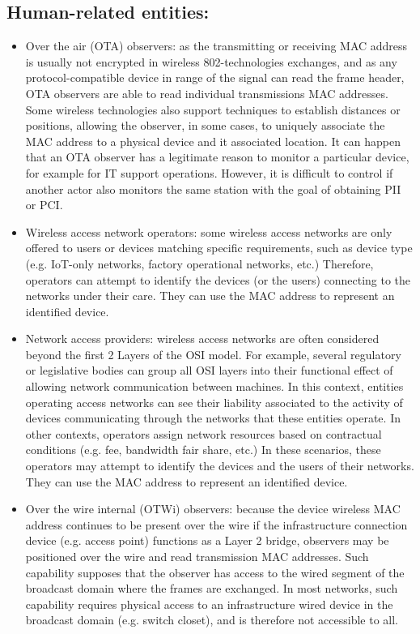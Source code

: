 \documentclass[10pt]{article}
\begin{document}
{\subsection{Human-related entities:}{
\begin{itemize}
    \item Over the air (OTA) observers: as the transmitting or receiving MAC address is usually not encrypted in wireless 802-technologies exchanges, and as any protocol-compatible device in range of the signal can read the frame header, OTA observers are able to read individual transmissions MAC addresses. Some wireless technologies also support techniques to establish distances or positions, allowing the observer, in some cases, to uniquely associate the MAC address to a physical device and it associated location. It can happen that an OTA observer has a legitimate reason to monitor a particular device, for example for IT support operations. However, it is difficult to control if another actor also monitors the same station with the goal of obtaining PII or PCI.
    \item Wireless access network operators: some wireless access networks are only offered to users or devices matching specific requirements, such as device type (e.g. IoT-only networks, factory operational networks, etc.) Therefore, operators can attempt to identify the devices (or the users) connecting to the networks under their care. They can use the MAC address to represent an identified device.
    \item Network access providers: wireless access networks are often considered beyond the first 2 Layers of the OSI model. For example, several regulatory or legislative bodies can group all OSI layers into their functional effect of allowing network communication between machines. In this context, entities operating access networks can see their liability associated to the activity of devices communicating through the networks that these entities operate. In other contexts, operators assign network resources based on contractual conditions (e.g. fee, bandwidth fair share, etc.) In these scenarios, these operators may attempt to identify the devices and the users of their networks. They can use the MAC address to represent an identified device.
    \item Over the wire internal (OTWi) observers: because the device wireless MAC address continues to be present over the wire if the infrastructure connection device (e.g. access point) functions as a Layer 2 bridge, observers may be positioned over the wire and read transmission MAC addresses. Such capability supposes that the observer has access to the wired segment of the broadcast domain where the frames are exchanged. In most networks, such capability requires physical access to an infrastructure wired device in the broadcast domain (e.g. switch closet), and is therefore not accessible to all.

\end{itemize}}}
\end{document}
